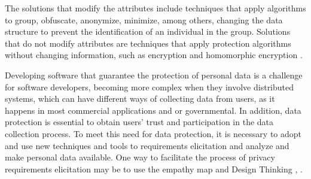 \documentclass[conference]{IEEEtran}
\begin{document}
The solutions that modify the attributes include techniques that apply algorithms to group, obfuscate, anonymize, minimize, among others, changing the data structure to prevent the identification of an individual in the group. Solutions that do not modify attributes are techniques that apply protection algorithms without changing information, such as encryption and homomorphic encryption  \cite{DBLP:journals/iotj/Vergara-Laurens17}.


Developing software that guarantee the protection of personal data is a challenge for software developers, becoming more complex when they involve distributed systems, which can have different ways of collecting data from users, as it happens in most commercial applications and or governmental. In addition, data protection is essential to obtain users' trust and participation in the data collection process. To meet this need for data protection, it is necessary to adopt and use new techniques and tools to requirements elicitation and analyze and make personal data available. One way to facilitate the process of privacy requirements elicitation may be to use the empathy map \cite{DBLP:conf/sbes/FerreiraCB15} and Design Thinking \cite{DBLP:books/lib/brown2009change}, \cite{DBLP:conf/hci/CanedoC18}.

\end{document}

